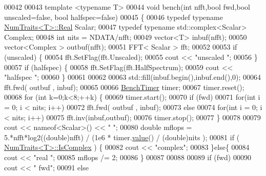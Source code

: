 \begin{DoxyCode}
00042 
00043 \textcolor{keyword}{template} <\textcolor{keyword}{typename} T>
00044 \textcolor{keywordtype}{void} bench(\textcolor{keywordtype}{int} nfft,\textcolor{keywordtype}{bool} fwd,\textcolor{keywordtype}{bool} unscaled=\textcolor{keyword}{false}, \textcolor{keywordtype}{bool} halfspec=\textcolor{keyword}{false})
00045 \{
00046     \textcolor{keyword}{typedef} \textcolor{keyword}{typename} \hyperlink{group___core___module_struct_eigen_1_1_num_traits}{NumTraits<T>::Real} Scalar;
00047     \textcolor{keyword}{typedef} \textcolor{keyword}{typename} std::complex<Scalar> Complex;
00048     \textcolor{keywordtype}{int} nits = NDATA/nfft;
00049     vector<T> inbuf(nfft);
00050     vector<Complex > outbuf(nfft);
00051     FFT< Scalar > fft;
00052 
00053     \textcolor{keywordflow}{if} (unscaled) \{
00054         fft.SetFlag(fft.Unscaled);
00055         cout << \textcolor{stringliteral}{"unscaled "};
00056     \}
00057     \textcolor{keywordflow}{if} (halfspec) \{
00058         fft.SetFlag(fft.HalfSpectrum);
00059         cout << \textcolor{stringliteral}{"halfspec "};
00060     \}
00061 
00062 
00063     std::fill(inbuf.begin(),inbuf.end(),0);
00064     fft.fwd( outbuf , inbuf);
00065 
00066     \hyperlink{class_eigen_1_1_bench_timer}{BenchTimer} timer;
00067     timer.reset();
00068     \textcolor{keywordflow}{for} (\textcolor{keywordtype}{int} k=0;k<8;++k) \{
00069         timer.start();
00070         \textcolor{keywordflow}{if} (fwd)
00071             \textcolor{keywordflow}{for}(\textcolor{keywordtype}{int} i = 0; i < nits; i++)
00072                 fft.fwd( outbuf , inbuf);
00073         \textcolor{keywordflow}{else}
00074             \textcolor{keywordflow}{for}(\textcolor{keywordtype}{int} i = 0; i < nits; i++)
00075                 fft.inv(inbuf,outbuf);
00076         timer.stop();
00077     \}
00078 
00079     cout << nameof<Scalar>() << \textcolor{stringliteral}{" "};
00080     \textcolor{keywordtype}{double} mflops = 5.*nfft*log2((\textcolor{keywordtype}{double})nfft) / (1e6 * timer.\hyperlink{class_eigen_1_1_bench_timer_a26760f963ed8b64c126159bfea57735e}{value}() / (double)nits );
00081     \textcolor{keywordflow}{if} ( \hyperlink{group___core___module_struct_eigen_1_1_num_traits}{NumTraits<T>::IsComplex} ) \{
00082         cout << \textcolor{stringliteral}{"complex"};
00083     \}\textcolor{keywordflow}{else}\{
00084         cout << \textcolor{stringliteral}{"real   "};
00085         mflops /= 2;
00086     \}
00087 
00088 
00089     \textcolor{keywordflow}{if} (fwd)
00090         cout << \textcolor{stringliteral}{" fwd"};
00091     \textcolor{keywordflow}{else}

\end{DoxyCode}
